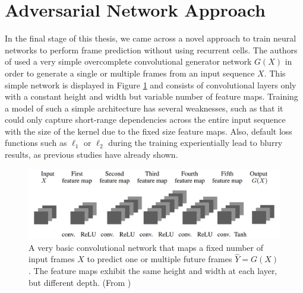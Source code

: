 \section{Adversarial Network Approach} \label{sec:related_gan}

In the final stage of this thesis, we came across a novel approach to train neural networks to perform frame prediction without using recurrent cells. The authors of \parencite{deep_multiscale_video_pred} used a very simple overcomplete convolutional generator network $ G(X) $ in order to generate a single or multiple frames from an input sequence $ X $. This simple network is displayed in Figure \ref{fig:gan_generator} and consists of convolutional layers only with a constant height and width but variable number of feature maps. Training a model of such a simple architecture has several weaknesses, such as that it could only capture short-range dependencies across the entire input sequence with the size of the kernel due to the fixed size feature maps. Also, default loss functions such as $\ell_1$ or $\ell_2$ during the training experientially lead to blurry results, as previous studies have already shown.

\begin{figure}[htb]
	\centering
	\includegraphics[width=0.8\linewidth]{figures/related/deep_multiscale_generator.png} 
	\caption[Convolutional Autoencoder for Future Generation]{A very basic convolutional network that maps a fixed number of input frames $X$ to predict one or multiple future frames $\hat{Y} = G(X)$. The feature maps exhibit the same height and width at each layer, but different depth. (From \parencite{deep_multiscale_video_pred})} \label{fig:gan_generator}
\end{figure}

